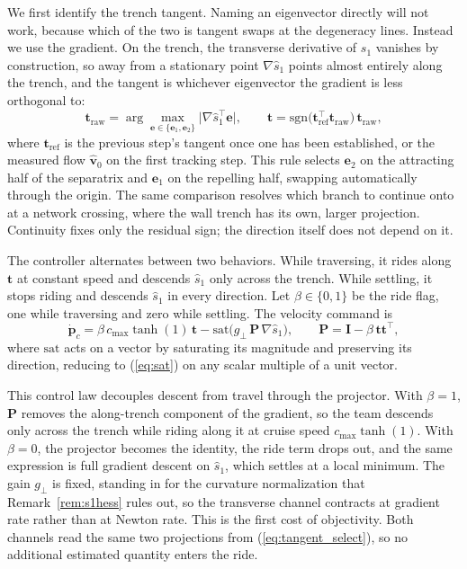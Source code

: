 \documentclass[lettersize,journal]{IEEEtran}
\begin{document}
We first identify the trench tangent. Naming an eigenvector directly will
not work, because which of the two is tangent swaps at the degeneracy
lines. Instead we use the gradient. On the trench, the transverse
derivative of $s_1$ vanishes by construction, so away from a stationary
point $\nabla\hat{s}_1$ points almost entirely along the trench, and the
tangent is whichever eigenvector the gradient is less orthogonal to:
\begin{equation}
    \mathbf{t}_{\mathrm{raw}} =
    \arg\max_{\mathbf{e} \in \{\mathbf{e}_1, \mathbf{e}_2\}}
    \bigl\lvert \nabla\hat{s}_1^\top \mathbf{e} \bigr\rvert,
    \qquad
    \mathbf{t} = \mathrm{sgn}\bigl(\mathbf{t}_{\mathrm{ref}}^\top
    \mathbf{t}_{\mathrm{raw}}\bigr)\,\mathbf{t}_{\mathrm{raw}},
    \label{eq:tangent_select}
\end{equation}
where $\mathbf{t}_{\mathrm{ref}}$ is the previous step's tangent once one
has been established, or the measured flow $\hat{\mathbf{v}}_0$ on the
first tracking step. This rule selects $\mathbf{e}_2$ on the attracting
half of the separatrix and $\mathbf{e}_1$ on the repelling half, swapping
automatically through the origin. The same comparison resolves which
branch to continue onto at a network crossing, where the wall trench has
its own, larger projection. Continuity fixes only the residual sign; the
direction itself does not depend on it.

The controller alternates between two behaviors. While traversing, it
rides along $\mathbf{t}$ at constant speed and descends $\hat{s}_1$ only
across the trench. While settling, it stops riding and descends
$\hat{s}_1$ in every direction. Let $\beta \in \{0,1\}$ be the ride flag,
one while traversing and zero while settling. The velocity command is
\begin{equation}
    \dot{\mathbf{p}}_c =
    \beta\,c_{\max}\tanh(1)\,\mathbf{t}
    - \mathrm{sat}\!\bigl(g_\perp\,\mathbf{P}\,\nabla\hat{s}_1\bigr),
    \qquad
    \mathbf{P} = \mathbf{I} - \beta\,\mathbf{t}\mathbf{t}^\top,
    \label{eq:oecs_law}
\end{equation}
where $\mathrm{sat}$ acts on a vector by saturating its magnitude and
preserving its direction, reducing to (\ref{eq:sat}) on any scalar
multiple of a unit vector.

This control law decouples descent from travel through the projector.
With $\beta = 1$, $\mathbf{P}$ removes the along-trench component of the
gradient, so the team descends only across the trench while riding along
it at cruise speed $c_{\max}\tanh(1)$. With $\beta = 0$, the projector
becomes the identity, the ride term drops out, and the same expression
is full gradient descent on $\hat{s}_1$, which settles at a local
minimum. The gain $g_\perp$ is fixed, standing in for the curvature
normalization that Remark~\ref{rem:s1hess} rules out, so the transverse
channel contracts at gradient rate rather than at Newton rate. This is
the first cost of objectivity. Both channels read the same two
projections from (\ref{eq:tangent_select}), so no additional estimated
quantity enters the ride.
\end{document}
